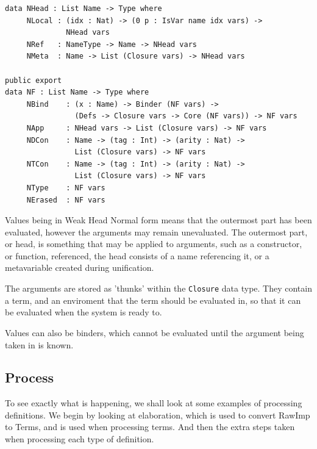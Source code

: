\documentclass[a4paper]{article}
\begin{document}
\begin{center}
\begin{verbatim}
data NHead : List Name -> Type where
	 NLocal : (idx : Nat) -> (0 p : IsVar name idx vars) ->
			  NHead vars
	 NRef   : NameType -> Name -> NHead vars
	 NMeta  : Name -> List (Closure vars) -> NHead vars

public export
data NF : List Name -> Type where
	 NBind    : (x : Name) -> Binder (NF vars) ->
				(Defs -> Closure vars -> Core (NF vars)) -> NF vars
	 NApp     : NHead vars -> List (Closure vars) -> NF vars
	 NDCon    : Name -> (tag : Int) -> (arity : Nat) ->
				List (Closure vars) -> NF vars
	 NTCon    : Name -> (tag : Int) -> (arity : Nat) ->
				List (Closure vars) -> NF vars
	 NType    : NF vars
	 NErased  : NF vars
\end{verbatim}
\end{center}

Values being in Weak Head Normal form means that the outermost part has 
been evaluated, however the arguments may remain unevaluated. The 
outermost part, or head, is something that may be applied to arguments, 
such as a constructor, or function, referenced, the head consists of a
name referencing it, or a metavariable created during unification. 

The arguments are stored as 'thunks' within the \texttt{Closure} data type.  
They contain a term, and an enviroment that the term should be evaluated 
in, so that it can be evaluated when the system is ready to. 

Values can also be binders, which cannot be evaluated until the argument
being taken in is known. 

\subsection{Process}
\label{sec:org9508737}
To see exactly what is happening, we shall look at some examples of 
processing definitions. We begin by looking at elaboration, which is 
used to convert RawImp to Terms, and is used when processing terms. 
And then the extra steps taken when processing each type of definition. 
\end{document}

